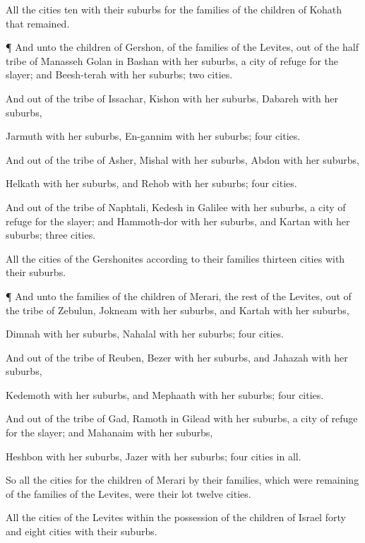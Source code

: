 {All the
cities
{}
ten with their
suburbs for the
families of the
children of
Kohath that
remained.


\par }{\PP {}¶ And unto the
children of
Gershon, of the
families of the
Levites, out of the
{}
half
tribe of
Manasseh
{}
Golan in
Bashan with her
suburbs,
{} a
city of
refuge for the
slayer; and
Beesh-terah with her
suburbs;
two
cities.

And out of the
tribe of
Issachar,
Kishon with her
suburbs,
Dabareh with her
suburbs,

Jarmuth with her
suburbs,
En-gannim with her
suburbs;
four
cities.

And out of the
tribe of
Asher,
Mishal with her
suburbs,
Abdon with her
suburbs,

Helkath with her
suburbs, and
Rehob with her
suburbs;
four
cities.

And out of the
tribe of
Naphtali,
Kedesh in
Galilee with her
suburbs,
{} a
city of
refuge for the
slayer; and
Hammoth-dor with her
suburbs, and
Kartan with her
suburbs;
three
cities.

All the
cities of the
Gershonites according to their
families
{}
thirteen
cities with their
suburbs.


\par }{\PP {}¶ And unto the
families of the
children of
Merari, the
rest of the
Levites, out of the
tribe of
Zebulun,
Jokneam with her
suburbs, and
Kartah with her
suburbs,

Dimnah with her
suburbs,
Nahalal with her
suburbs;
four
cities.

And out of the tribe of
Reuben,
Bezer with her suburbs, and
Jahazah with her suburbs,

Kedemoth with her suburbs, and
Mephaath with her suburbs;
four
cities.

And out of the
tribe of
Gad,
Ramoth in
Gilead with her
suburbs,
{} a
city of
refuge for the
slayer; and
Mahanaim with her
suburbs,

Heshbon with her
suburbs,
Jazer with her
suburbs;
four
cities in all.

So all the
cities for the
children of
Merari by their
families, which were
remaining of the
families of the
Levites, were
{} their
lot
twelve
cities.

All the
cities of the
Levites
within the
possession of the
children of
Israel
{}
forty and
eight
cities with their
suburbs.

}
